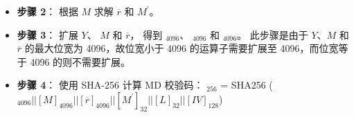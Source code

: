 \documentclass[main\_\_CN.tex]{subfiles}
\begin{document}
\begin{itemize}
    \item {\bfseries 步骤 2}：
          根据 \begin{math}M\end{math} 求解 \begin{math}\overline{r}\end{math} 和 \begin{math}M^{\prime} \end{math}。

    \item {\bfseries 步骤 3}：
          扩展 \begin{math}Y\end{math}、
               \begin{math}M\end{math} 和
               \begin{math}\overline{r}\end{math}，
          得到 \begin{math}[Y]_{4096}\end{math}、
               \begin{math}[M]_{4096}\end{math} 和
               \begin{math}[\overline{r}]_{4096}\end{math}。
          此步骤是由于 \begin{math}Y\end{math}、\begin{math}M\end{math} 和 \begin{math}\overline{r}\end{math} 的最大位宽为 4096，故位宽小于 4096 的运算子需要扩展至 4096，而位宽等于 4096 的则不需要扩展。


    \item {\bfseries 步骤 4}：
            使用 SHA-256 计算 MD 校验码：
                \begin{math}[MD]_{256}\end{math} = SHA256 (\begin{math}
                [Y]_{4096} ||
                [M]_{4096} ||
                [\overline{r}]_{4096} ||
                [M^{\prime}]_{32} ||
                [L]_{32} ||
                [IV]_{128}
            \end{math})


\end{itemize}
\end{document}

